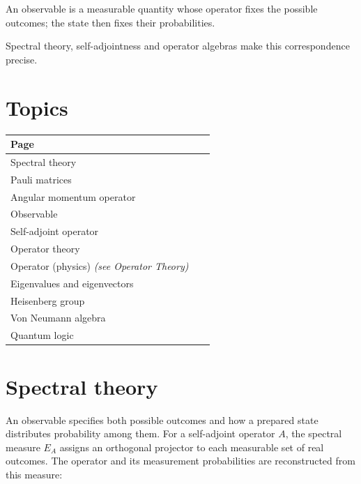 \documentclass[11pt,oneside]{book}
\begin{document}
An observable is a measurable quantity whose operator fixes the possible outcomes; the state then fixes their probabilities.

Spectral theory, self-adjointness and operator algebras make this correspondence precise.

\section*{Topics}

\begin{longtable}{p{0.92\linewidth}}
\toprule
Page \\
\midrule
\endhead
{}\label{page:spectral-theory}Spectral theory \\
\label{page:pauli-matrices}Pauli matrices \\
\label{page:angular-momentum-operator}Angular momentum operator \\
\label{page:observable}Observable \\
\label{page:self-adjoint-operator}Self-adjoint operator \\
\label{page:operator-theory}Operator theory \\
\label{page:operator-physics}Operator (physics) \emph{(see Operator Theory)} \\
\label{page:eigenvalues-and-eigenvectors}Eigenvalues and eigenvectors \\
\label{page:heisenberg-group}Heisenberg group \\
\label{page:von-neumann-algebra}Von Neumann algebra \\
\label{page:quantum-logic}Quantum logic \\
\bottomrule
\end{longtable}

\clearpage

\section{Spectral theory}

\label{topic:spectral-theory}

An observable specifies both possible outcomes and how a prepared state distributes probability among them. For a self-adjoint operator \(A\), the spectral measure \(E_A\) assigns an orthogonal projector to each measurable set of real outcomes. The operator and its measurement probabilities are reconstructed from this measure:
\end{document}
